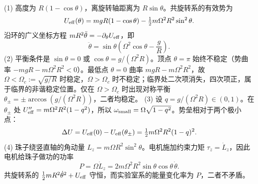 (1) 高度为 \(R(1-\cos\theta)\)，离旋转轴距离为 \(R\sin\theta\)。共旋转系的有效势为
\[U_{\rm eff}(\theta)=mgR(1-\cos\theta)-\tfrac12m\Omega^2R^2\sin^2\theta.\]
沿环的广义坐标方程 \(mR^2\ddot\theta=-\partial_\theta U_{\rm eff}\)，即
\[\ddot\theta=\sin\theta\left(\Omega^2\cos\theta-\frac gR\right).\]
(2) 平衡条件是 \(\sin\theta=0\) 或 \(\cos\theta=g/(\Omega^2R)\)。顶点 \(\theta=\pi\) 始终不稳定（势曲率 \(-mgR-m\Omega^2R^2<0\)）。最低点 \(\theta=0\) 曲率 \(mgR-m\Omega^2R^2\)，故 \(\Omega<\Omega_c:=\sqrt{g/R}\) 时稳定，\(\Omega>\Omega_c\) 时不稳定；临界处二次项消失，四次项正，属于临界的非谐稳定位置。仅在 \(\Omega>\Omega_c\) 时出现对称平衡 \(\theta_\pm=\pm\arccos(g/(\Omega^2R))\)，二者均稳定。
(3) 设 \(q=g/(\Omega^2R)\in(0,1)\)。在 \(\theta_\pm\) 处 \(U''_{\rm eff}=m\Omega^2R^2(1-q^2)\)，所以 \(\omega_{\rm small}=\Omega\sqrt{1-q^2}\)。势垒相对于两个极小点：
\[\Delta U=U_{\rm eff}(0)-U_{\rm eff}(\theta_\pm)=\tfrac12m\Omega^2R^2(1-q)^2.\]
(4) 珠子绕竖直轴的角动量 \(L_z=m\Omega R^2\sin^2\theta\)。电机施加约束力矩 \(\tau_z=\dot L_z\)，因此电机给珠子做功的功率
\[P=\Omega\dot L_z=2m\Omega^2R^2\sin\theta\cos\theta\,\dot\theta.\]
共旋转系的 \(\tfrac12mR^2\dot\theta^2+U_{\rm eff}\) 守恒，而实验室系的能量变化率为 \(P\)，二者不矛盾。
